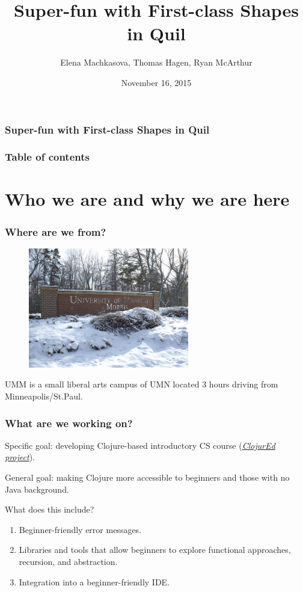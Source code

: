 \documentclass{beamer}
\begin{document}
\author{Elena Machkasova, Thomas Hagen, Ryan McArthur}
\title{Super-fun with First-class Shapes in Quil}
\date{November 16, 2015}


\begin{frame}
\frametitle {Super-fun with First-class Shapes in Quil}
\maketitle
\end{frame}

\begin{frame}
\frametitle{Table of contents}
\tableofcontents  
\end{frame}

\section{Who we are and why we are here}

\begin{frame}
\frametitle{Where are we from?}
\begin{figure}[h]
\includegraphics[width=7cm]{PresentationImages/umm-winter.jpg}
\end{figure}
UMM is a small liberal arts campus of UMN located 3 hours driving from Minneapolis/St.Paul. 
\end{frame}

\begin{frame}
\frametitle{What are we working on?}
Specific goal: developing Clojure-based introductory CS course ({\it \href{http://cda.morris.umn.edu/~elenam/\#clojure}{ClojurEd project}}). 

General goal: making Clojure more accessible to beginners and those with no Java background. 

What does this include? 
\begin{enumerate}
\item Beginner-friendly error messages. 
\item Libraries and tools that allow beginners to explore functional approaches, recursion, and abstraction.
\item Integration into a beginner-friendly IDE. 
\end{enumerate}
\end{frame}
\end{document}
